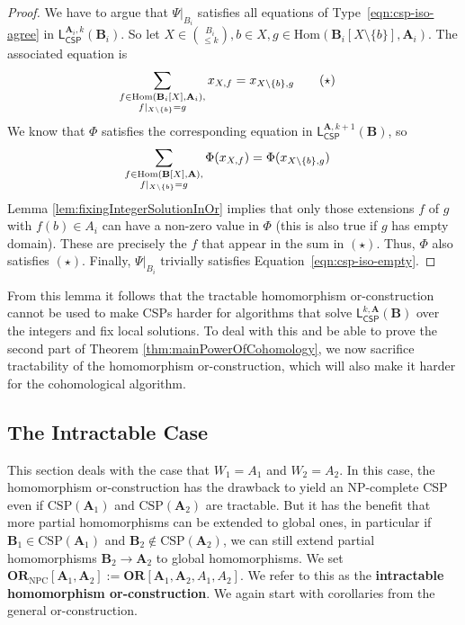 \documentclass[a4paper,english, thm-restate]{lipics-v2021}
\newcommand{\defining}[1]{\textbf{#1}}
\DeclarePairedDelimiter\set{\lbrace}{\rbrace}
\newcommand{\StructA}{\mathbf{A}}
\newcommand{\StructB}{\mathbf{B}}
\newcommand{\CSP}[1]{\mathrm{CSP}(#1)}
\newcommand{\restrict}[2]{#1|_{#2}}
\newcommand{\Hom}[2]{\mathrm{Hom}(#1,#2)}
\newcommand{\leqs}{\mathsf{L}}
\newcommand{\cspiso}[3]{\leqs^{#1,#2}_{\mathsf{CSP}}(#3)}
\newcommand{\ORparam}[1]{\mathbf{OR}[#1]}
\newcommand{\ORNPC}[1]{\mathbf{OR}_\text{NPC}[#1]}
\begin{document}
	\integerSolutionWithLocalFixingSolvesBi*
	\begin{proof}
		We have to argue that $\restrict{\Psi}{B_i}$ satisfies all equations of Type~\ref{eqn:csp-iso-agree} in $\cspiso{\StructA_i}{k}{\StructB_i}$. So let $X \in \binom{B_i}{\leq k}, b \in X, g \in \Hom{\StructB_i[X \setminus \{b\}]}{\StructA_i}$. The associated equation is
		\begin{align*}
			\sum_{\substack{f \in \Hom{\StructB_i[X]}{\StructA_i},\\ \restrict{f}{X\setminus\set{b}} = g}} x_{X,f} &=  x_{X\setminus{\set{b}},g}  \tag{$\star$}
		\end{align*}
		We know that $\Phi$ satisfies the corresponding equation in $\cspiso{\StructA}{k+1}{\StructB}$, so
		\begin{align*}
			\sum_{\substack{f \in \Hom{\StructB[X]}{\StructA},\\ \restrict{f}{X\setminus\set{b}} = g}} \Phi(x_{X,f}) &=  \Phi(x_{X\setminus{\set{b}},g})  
		\end{align*}
		Lemma \ref{lem:fixingIntegerSolutionInOr} implies that only those extensions $f$ of $g$ with $f(b) \in A_i$ can have a non-zero value in $\Phi$ (this is also true if $g$ has empty domain). These are precisely the $f$ that appear in the sum in $(\star)$. Thus, $\Phi$ also satisfies $(\star)$. 	
		Finally, $\restrict{\Psi}{B_i}$ trivially satisfies Equation~\ref{eqn:csp-iso-empty}.
	\end{proof}
	
	\noindent From this lemma it follows that the tractable homomorphism or-construction 
	cannot be used to make CSPs harder for algorithms that solve $\cspiso{k}{\StructA}{\StructB}$ over the integers
	and fix local solutions.
	To deal with this and be able to prove the second part of Theorem \ref{thm:mainPowerOfCohomology}, we now sacrifice tractability of the homomorphism or-construction, which will also make it harder for the cohomological algorithm.
	
	
	
	\subsection{The Intractable Case}
	\label{app:intractable-or}
	This section deals with the case that $W_1 =A_1$ and $W_2 = A_2$.
	In this case, the homomorphism or-construction has the drawback to yield an NP-complete CSP even if $\CSP{\StructA_1}$ and $\CSP{\StructA_2}$ are tractable.
	But it has the benefit that more partial homomorphisms can be extended to global ones, in particular if $\StructB_1\in\CSP{\StructA_1}$ and $\StructB_2 \notin \CSP{\StructA_2}$,
	we can still extend partial homomorphisms $\StructB_2 \to \StructA_2$ to
	global homomorphisms.
	We set $\ORNPC{\StructA_1,\StructA_2} := \ORparam{\StructA_1,\StructA_2,A_1,A_2}$.
	We refer to this as the \defining{intractable homomorphism or-construction}.
	We again start with corollaries from the general or-construction.
	
\end{document}
